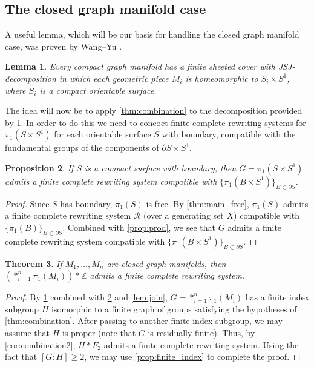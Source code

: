 \documentclass[12pt, a4paper]{amsart}
\newtheorem{theorem}{Theorem}[section]
\newtheorem{lemma}[theorem]{Lemma}
\newtheorem{proposition}[theorem]{Proposition}
\theoremstyle{definition}
\newcommand{\Z}{\mathbb{Z}}
\begin{document}
\subsection{The closed graph manifold case}


A useful lemma, which will be our basis for handling the closed graph manifold case, was proven by Wang--Yu \cite[Lemma 0.4]{WY97}.

\begin{lemma}
\label{lem:product}
Every compact graph manifold has a finite sheeted cover with JSJ-decomposition in which each geometric piece $M_i$ is homeomorphic to $S_i\times S^1$, where $S_i$ is a compact orientable surface. 
\end{lemma}

The idea will now be to apply \cref{thm:combination} to the decomposition provided by \cref{lem:product}. In order to do this we need to concoct finite complete rewriting systems for $\pi_1(S\times S^1)$ for each orientable surface $S$ with boundary, compatible with the fundamental groups of the components of $\partial S\times S^1$.

\begin{proposition}
\label{prop:seifert}
If $S$ is a compact surface with boundary, then $G = \pi_1(S\times S^1)$ admits a finite complete rewriting system compatible with $\{\pi_1(B\times S^1)\}_{B\subset \partial S}$.
\end{proposition}

\begin{proof}
Since $S$ has boundary, $\pi_1(S)$ is free. By \cref{thm:main_free}, $\pi_1(S)$ admits a finite complete rewriting system $\mathcal{R}$ (over a generating set $X$) compatible with $\{\pi_1(B)\}_{B\subset \partial S}$. Combined with \cref{prop:prod}, we see that $G$ admits a finite complete rewriting system compatible with $\{\pi_1(B\times S^1)\}_{B\subset \partial S}$.
\end{proof}




\begin{theorem}
\label{thm:graph_manifold}
If $M_1, \ldots, M_n$ are closed graph manifolds, then $(*_{i=1}^n\pi_1(M_i))*\Z$ admits a finite complete rewriting system.
\end{theorem}

\begin{proof}
By \cref{lem:product} combined with \cref{prop:seifert} and \cref{lem:join}, $G = *_{i=1}^n\pi_1(M_i)$ has a finite index subgroup $H$ isomorphic to a finite graph of groups satisfying the hypotheses of \cref{thm:combination}. After passing to another finite index subgroup, we may assume that $H$ is proper (note that $G$ is residually finite). Thus, by \cref{cor:combination2}, $H*F_2$ admits a finite complete rewriting system. Using the fact that $[G:H]\geqslant 2$, we may use \cref{prop:finite_index} to complete the proof.
\end{proof}
\end{document}
